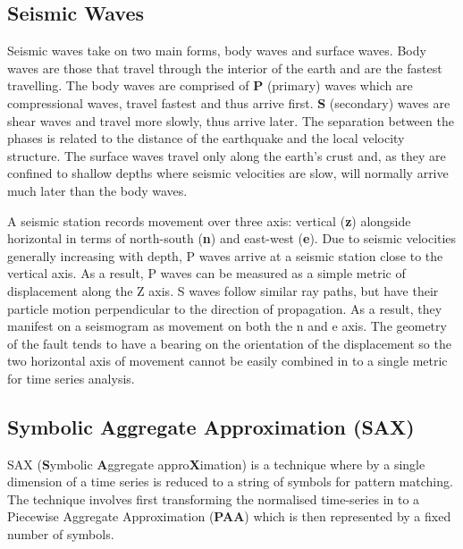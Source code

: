 \documentclass[11pt, a4paper]{scrartcl}
\begin{document}
	\subsection{Seismic Waves}
	\label{sec:seismicwaves}
	Seismic waves take on two main forms, body waves and surface waves.  Body waves are those that travel through the interior of the earth and are the fastest travelling.  The body waves are comprised of \textbf{P} (primary) waves which are compressional waves, travel fastest and thus arrive first.  \textbf{S} (secondary) waves are shear waves and travel more slowly, thus arrive later.  The separation between the phases is related to the distance of the earthquake and the local velocity structure. The surface waves travel only along the earth's crust and, as they are confined to shallow depths where seismic velocities are slow, will normally arrive much later than the body waves.
	
	A seismic station records movement over three axis: vertical (\textbf{z}) alongside horizontal in terms of north-south (\textbf{n}) and east-west (\textbf{e}).  Due to seismic velocities generally increasing with depth, P waves arrive at a seismic station close to the vertical axis.  As a result, P waves can be measured as a simple metric of displacement along the Z axis.  S waves follow similar ray paths, but have their particle motion perpendicular to the direction of propagation.  As a result, they manifest on a seismogram as movement on both the n and e axis. The geometry of the fault tends to have a bearing on the orientation of the displacement so the two horizontal axis of movement cannot be easily combined in to a single metric for time series analysis.
	
	\subsection{Symbolic Aggregate Approximation (SAX)}
	SAX (\textbf{S}ymbolic \textbf{A}ggregate appro\textbf{X}imation) \citep{sax} is a technique where by a single dimension of a time series is reduced to a string of symbols for pattern matching.  The technique involves first transforming the normalised time-series in to a Piecewise Aggregate Approximation (\textbf{PAA}) which is then represented by a fixed number of symbols.
	
\end{document}
